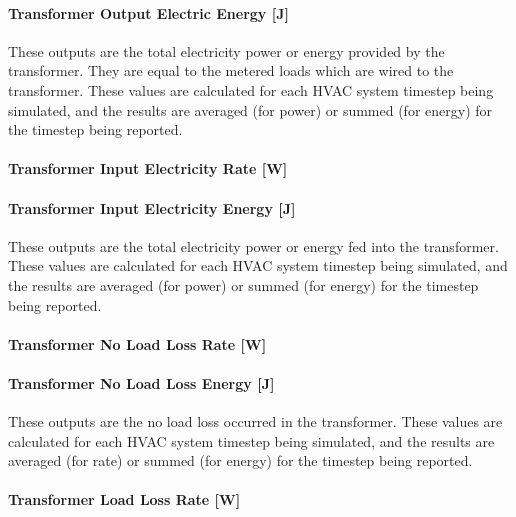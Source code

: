 \paragraph{Transformer Output Electric Energy {[}J{]}}\label{transformer-output-electric-energy-j}

These outputs are the total electricity power or energy provided by the transformer. They are equal to the metered loads which are wired to the transformer. These values are calculated for each HVAC system timestep being simulated, and the results are averaged (for power) or summed (for energy) for the timestep being reported.

\paragraph{Transformer Input Electricity Rate {[}W{]}}\label{transformer-input-electric-power-w}

\paragraph{Transformer Input Electricity Energy {[}J{]}}\label{transformer-input-electric-energy-j}

These outputs are the total electricity power or energy fed into the transformer. These values are calculated for each HVAC system timestep being simulated, and the results are averaged (for power) or summed (for energy) for the timestep being reported.

\paragraph{Transformer No Load Loss Rate {[}W{]}}\label{transformer-no-load-loss-rate-w}

\paragraph{Transformer No Load Loss Energy {[}J{]}}\label{transformer-no-load-loss-energy-j}

These outputs are the no load loss occurred in the transformer. These values are calculated for each HVAC system timestep being simulated, and the results are averaged (for rate) or summed (for energy) for the timestep being reported.

\paragraph{Transformer Load Loss Rate {[}W{]}}\label{transformer-load-loss-rate-w}

